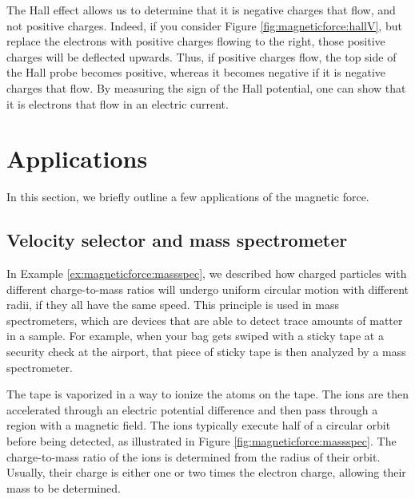 The Hall effect allows us to determine that it is negative charges that flow, and not positive charges. Indeed, if you consider Figure \ref{fig:magneticforce:hallV}, but replace the electrons with positive charges flowing to the right, those positive charges will be deflected upwards. Thus, if positive charges flow, the top side of the Hall probe becomes positive, whereas it becomes negative if it is negative charges that flow. By measuring the sign of the Hall potential, one can show that it is electrons that flow in an electric current.

\section{Applications}
In this section, we briefly outline a few applications of the magnetic force.
\subsection{Velocity selector and mass spectrometer}
In Example \ref{ex:magneticforce:massspec}, we described how charged particles with different charge-to-mass ratios will undergo uniform circular motion with different radii, if they all have the same speed. This principle is used in mass spectrometers, which are devices that are able to detect trace amounts of matter in a sample. For example, when your bag gets swiped with a sticky tape at a security check at the airport, that piece of sticky tape is then analyzed by a mass spectrometer.

The tape is vaporized in a way to ionize the atoms on the tape. The ions are then accelerated through an electric potential difference and then pass through a region with a magnetic field. The ions typically execute half of a circular orbit before being detected, as illustrated in Figure \ref{fig:magneticforce:massspec}. The charge-to-mass ratio of the ions is determined from the radius of their orbit. Usually, their charge is either one or two times the electron charge, allowing their mass to be determined. 

